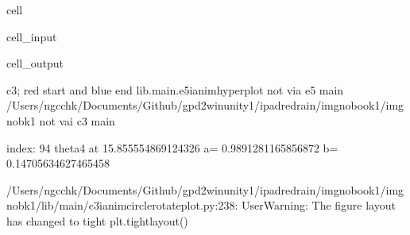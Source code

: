 \documentclass[letterpaper,10pt,english]{jupyterBook}
\begin{document}
\begin{sphinxuseclass}{cell}\begin{sphinxVerbatimInput}

\begin{sphinxuseclass}{cell_input}
\begin{sphinxVerbatim}[commandchars=\\\{\}]
 
 
   
\end{sphinxVerbatim}

\end{sphinxuseclass}\end{sphinxVerbatimInput}
\begin{sphinxVerbatimOutput}

\begin{sphinxuseclass}{cell_output}
\begin{sphinxVerbatim}[commandchars=\\\{\}]
c3; red start and blue end
lib.main.e5\PYGZus{}i\PYGZus{}anim\PYGZus{}hyperplot
not via e5 main
/Users/ngcchk/Documents/Github/gpd2\PYGZhy{}win\PYGZhy{}unity1/ipadred\PYGZhy{}rain/imgno\PYGZus{}book1/imgnobk1
not vai c3 main

index: 94 
theta4 at  15.855554869124326 
 a= \PYGZhy{}0.9891281165856872  b= \PYGZhy{}0.14705634627465458 
\end{sphinxVerbatim}

\begin{sphinxVerbatim}[commandchars=\\\{\}]
/Users/ngcchk/Documents/Github/gpd2\PYGZhy{}win\PYGZhy{}unity1/ipadred\PYGZhy{}rain/imgno\PYGZus{}book1/imgnobk1/lib/main/c3\PYGZus{}i\PYGZus{}anim\PYGZus{}circle\PYGZus{}rotate\PYGZus{}plot.py:238: UserWarning: The figure layout has changed to tight
  plt.tight\PYGZus{}layout()
\end{sphinxVerbatim}

\noindent{}

\end{sphinxuseclass}\end{sphinxVerbatimOutput}

\end{sphinxuseclass}
\end{document}
